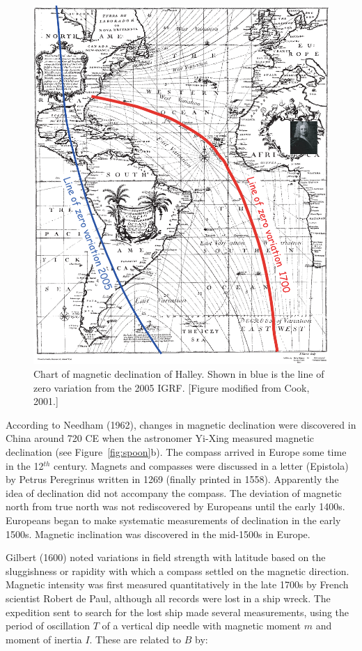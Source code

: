 \begin{figure}[h!tb]
\centering  \includegraphics[width=10 cm]{EPSfiles/halley.eps}
\caption{Chart of magnetic declination of Halley. Shown in blue is the line of zero variation from the 2005 IGRF.  [Figure modified from Cook, 2001.]}
\label{fig:halley}
\end{figure}\nocite{cook01}


According to 
Needham (1962),  \nocite{needham62} changes in magnetic declination were  discovered in China around 720 CE when the astronomer Yi-Xing measured
 magnetic declination (see Figure~\ref{fig:spoon}b).   The compass arrived in Europe some time in the 12$^{th}$ century.  Magnets and compasses were discussed in a letter (Epistola)  by 
Petrus Peregrinus written in 1269 (finally printed in 1558).  Apparently the idea of declination did not accompany the compass. The deviation of magnetic north from true north  was not  rediscovered by Europeans until the early 1400s.  Europeans began to make systematic measurements of declination in the early 1500s.    Magnetic inclination was discovered in the mid-1500s in Europe.

Gilbert (1600) noted variations in field strength with latitude based on the sluggishness or rapidity with which a compass settled on the magnetic direction.    Magnetic intensity was first measured quantitatively  in the late 1700s by French scientist Robert 
de Paul, although all records were lost in a ship wreck.  The expedition sent to search for the lost ship made several measurements,  using the    period of oscillation $T$ of a vertical dip needle with magnetic moment $m$ and moment of inertia $I$.  These are related to $B$ by: 

